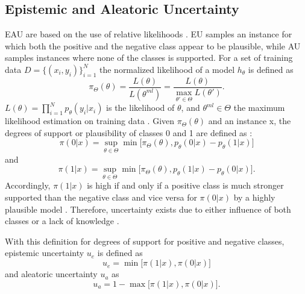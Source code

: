 \subsection{Epistemic and Aleatoric Uncertainty}
\label{subsec:epistemic_and_alreatoric_uncertainty}

\Ac{EAU} are based on the use of relative likelihoods \cite{nguyen2021howtomeasure}. 
\Ac{EU} samples an instance for which both the positive and the negative class appear to be plausible, while \ac{AU} samples instances where none of the classes is supported.
For a set of training data $D = \{(x_i, y_i)\}_{i=1}^{N}$ the normalized likelihood of a model $h_{\theta}$ is defined as
\begin{equation}
\pi_{\Theta}(\theta) = \frac{L(\theta)}{L(\theta^{ml})} = \frac{L(\theta)}{\max_{\theta'\in \Theta}{L(\theta')}}.
\end{equation} 
$L(\theta) = \prod_{i=1}^{N}{p_{\theta}(y_i | x_i)} $ is the likelihood of $\theta$, and $\theta^{ml} \in \Theta$ the maximum likelihood estimation on training data \cite{nguyen2021howtomeasure}.
Given $\pi_{\Theta}(\theta)$ and an instance x, the degrees of support or plausibility of  classes 0 and 1 are defined as \cite{nguyen2021howtomeasure}:
\begin{equation}
\pi(0 | x) = \sup_{\theta \in \Theta} \min \bigg[ \pi_{\Theta}(\theta), p_{\theta}(0 | x) - p_{\theta}(1 | x)\bigg]
\end{equation} 
and
\begin{equation}
\pi(1 | x) = \sup_{\theta \in \Theta} \min \bigg[ \pi_{\Theta}(\theta), p_{\theta}(1 | x) - p_{\theta}(0 | x)\bigg].
\end{equation} 
Accordingly, $\pi(1 | x)$ is high if and only if a positive class is much stronger supported than the negative class and vice versa for $\pi(0 | x)$ by a highly plausible model  \cite{nguyen2021howtomeasure}.
Therefore, uncertainty exists due to either influence of both classes or a lack of knowledge \cite{nguyen2021howtomeasure}. 

With this definition for degrees of support for positive and negative classes, epistemic uncertainty $u_e$ is defined as \cite{nguyen2021howtomeasure}
\begin{equation}
u_e = \min \bigg[ \pi(1 | x), \pi(0 | x) \bigg]
\end{equation}
and aleatoric uncertainty $u_a$ as
\begin{equation}
u_a = 1 - \max \bigg[ \pi(1 | x), \pi(0 | x) \bigg].
\end{equation}

